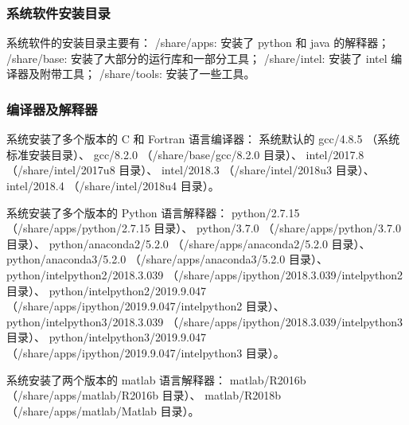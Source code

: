 \documentclass[UTF8]{ctexart}
\begin{document}
\subsubsection{系统软件安装目录}
系统软件的安装目录主要有：\newline
/share/apps: 安装了 python 和 java 的解释器；\newline
/share/base: 安装了大部分的运行库和一部分工具；\newline
/share/intel: 安装了 intel 编译器及附带工具；\newline
/share/tools: 安装了一些工具。

\subsubsection{编译器及解释器}
系统安装了多个版本的 C 和 Fortran 语言编译器：\newline
系统默认的 gcc/4.8.5 （系统标准安装目录）、\newline
gcc/8.2.0 （/share/base/gcc/8.2.0 目录）、\newline
intel/2017.8 （/share/intel/2017u8 目录）、\newline
intel/2018.3 （/share/intel/2018u3 目录）、\newline
intel/2018.4 （/share/intel/2018u4 目录）。
\bigskip

系统安装了多个版本的 Python 语言解释器：\newline
python/2.7.15 （/share/apps/python/2.7.15 目录）、\newline
python/3.7.0 （/share/apps/python/3.7.0 目录）、\newline
python/anaconda2/5.2.0 （/share/apps/anaconda2/5.2.0 目录）、\newline
python/anaconda3/5.2.0 （/share/apps/anaconda3/5.2.0 目录）、\newline
python/intelpython2/2018.3.039 （/share/apps/ipython/2018.3.039/intelpython2 目录）、\newline
python/intelpython2/2019.9.047 （/share/apps/ipython/2019.9.047/intelpython2 目录）、\newline
python/intelpython3/2018.3.039 （/share/apps/ipython/2018.3.039/intelpython3 目录）、\newline
python/intelpython3/2019.9.047 （/share/apps/ipython/2019.9.047/intelpython3 目录）。
\bigskip

系统安装了两个版本的 matlab 语言解释器：\newline
matlab/R2016b （/share/apps/matlab/R2016b 目录）、\newline
matlab/R2018b （/share/apps/matlab/Matlab 目录）。
\bigskip
\end{document}
